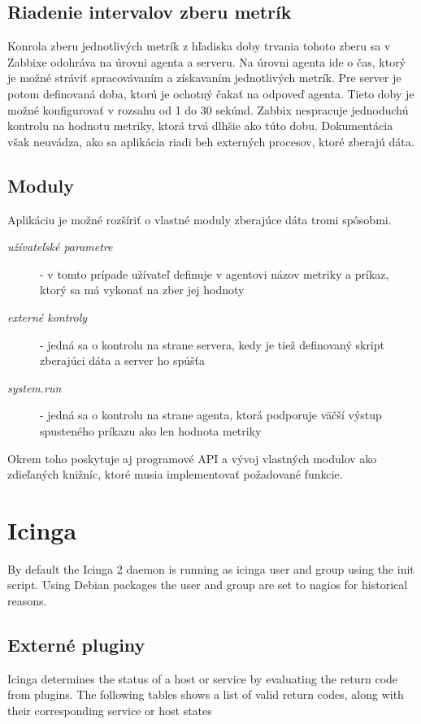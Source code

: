 \documentclass[11pt,final,oneside]{fithesis}
\begin{document}
\subsection{Riadenie intervalov zberu metrík}
Konrola zberu jednotlivých metrík z hľadiska doby trvania tohoto zberu sa v Zabbixe odohráva na úrovni agenta a serveru. Na úrovni agenta ide o čas, ktorý je možné stráviť spracovávaním a získavaním
jednotlivých metrík. Pre server je potom definovaná doba, ktorú je ochotný čakať na odpoveď agenta. Tieto doby je možné konfigurovať v rozsahu od 1 do 30 sekúnd.
\cite{20}
\cite{05}
Zabbix nespracuje jednoduchú kontrolu na hodnotu metriky, ktorá trvá dlhšie ako túto dobu.
\cite{04}
Dokumentácia však neuvádza, ako sa aplikácia riadi beh externých procesov, ktoré zberajú dáta.

\subsection{Moduly}
Aplikáciu je možné rozšíriť o vlastné moduly zberajúce dáta tromi spôsobmi. \cite{06}
\begin{description}
\item[\emph{užívateľské parametre}] - v tomto prípade užívateľ definuje v agentovi názov metriky a príkaz, ktorý sa má vykonať na zber jej hodnoty
\item[\emph{externé kontroly}] - jedná sa o kontrolu na strane servera, kedy je tiež definovaný skript zberajúci dáta a server ho spúšťa
\item[\emph{system.run}] - jedná sa o kontrolu na strane agenta, ktorá podporuje väčší výstup spusteného príkazu ako len hodnota metriky
\end{description}
Okrem toho poskytuje aj programové API a vývoj vlastných modulov ako zdieľaných knižníc, ktoré musia implementovať požadované funkcie.

\section{Icinga}
By default the Icinga 2 daemon is running as icinga user and group using the init script. Using Debian packages the user and group are set to nagios for historical reasons.
\cite{07}

\subsection{Externé pluginy}
Icinga determines the status of a host or service by evaluating the return code from plugins. The following tables shows a list of valid return codes, along with their corresponding service or host states
\cite{08}
\end{document}

